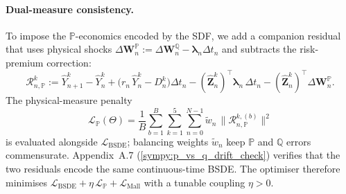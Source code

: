 \documentclass[11pt,letterpaper,oneside]{article}
\numberwithin{equation}{section}
\newcommand{\1}{\mathbf{1}}
\begin{document}
\paragraph{Dual-measure consistency.}
To impose the $\mathbb{P}$-economics encoded by the SDF, we add a companion residual that uses physical shocks $\Delta\bm{W}_{n}^{\mathbb{P}} := \Delta\bm{W}_{n}^{\mathbb{Q}} - \bm{\lambda}_n \Delta t_n$ and subtracts the risk-premium correction:
\begin{equation}\label{eq:bsde_residual_P}
  \mathcal{R}_{n,\mathbb{P}}^{k}
  := \widehat{Y}_{n+1}^{k} - \widehat{Y}_{n}^{k} + \big(r_n\,\widehat{Y}_{n}^{k} - D_{n}^{k}\big)\Delta t_n
     - (\widehat{\bm{Z}}_{n}^{k})^{\top}\bm{\lambda}_{n}\,\Delta t_n
     - (\widehat{\bm{Z}}_{n}^{k})^{\top}\Delta\bm{W}_{n}^{\mathbb{P}}.
\end{equation}
The physical-measure penalty
\[
  \mathcal{L}_{\mathbb{P}}(\Theta)
  = \frac{1}{B}\sum_{b=1}^{B}\sum_{k=1}^{5}\sum_{n=0}^{N-1} \tilde{w}_n \,\big\| \mathcal{R}_{n,\mathbb{P}}^{k,(b)} \big\|^2
\]
is evaluated alongside $\mathcal{L}_{\text{BSDE}}$; balancing weights $\tilde{w}_n$ keep $\mathbb{P}$ and $\mathbb{Q}$ errors commensurate. Appendix~A.7 (\cref{sympy:p_vs_q_drift_check}) verifies that the two residuals encode the same continuous-time BSDE. The optimiser therefore minimises $\mathcal{L}_{\text{BSDE}} + \eta\,\mathcal{L}_{\mathbb{P}} + \mathcal{L}_{\text{Mall}}$ with a tunable coupling $\eta>0$.
\end{document}
